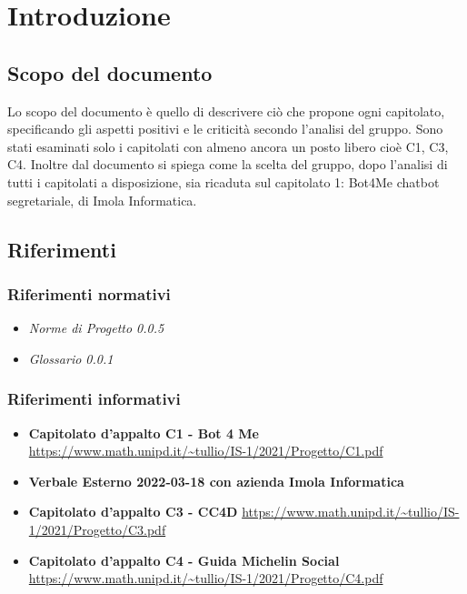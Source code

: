 \section{Introduzione}
		\subsection {Scopo del documento}
		Lo scopo del documento è quello di descrivere ciò che propone ogni capitolato, specificando gli aspetti positivi e le criticità secondo l'analisi del gruppo.
		\newline Sono stati esaminati solo i capitolati con almeno ancora un posto libero cioè C1, C3, C4. 
        Inoltre dal documento si spiega come la scelta del gruppo, dopo l'analisi di tutti i capitolati a disposizione, sia ricaduta sul capitolato 1: 
        Bot4Me chatbot segretariale, di Imola Informatica.
		\subsection {Riferimenti} 
			\subsubsection {Riferimenti normativi} 
			\begin{itemize}
				\item \textit{Norme di Progetto 0.0.5}
				\item \textit{Glossario 0.0.1}
			\end{itemize}
			\subsubsection {Riferimenti informativi} 
			\begin{itemize}
				\item \textbf{Capitolato d'appalto C1 - Bot 4 Me}\newline
				\url{https://www.math.unipd.it/~tullio/IS-1/2021/Progetto/C1.pdf}
				\item \textbf{Verbale Esterno 2022-03-18 con azienda Imola Informatica}
				\item \textbf{Capitolato d'appalto C3 - CC4D}\newline
				\url{https://www.math.unipd.it/~tullio/IS-1/2021/Progetto/C3.pdf}
				\item \textbf{Capitolato d'appalto C4 - Guida Michelin Social}\newline
				\url{https://www.math.unipd.it/~tullio/IS-1/2021/Progetto/C4.pdf}
			\end{itemize}
